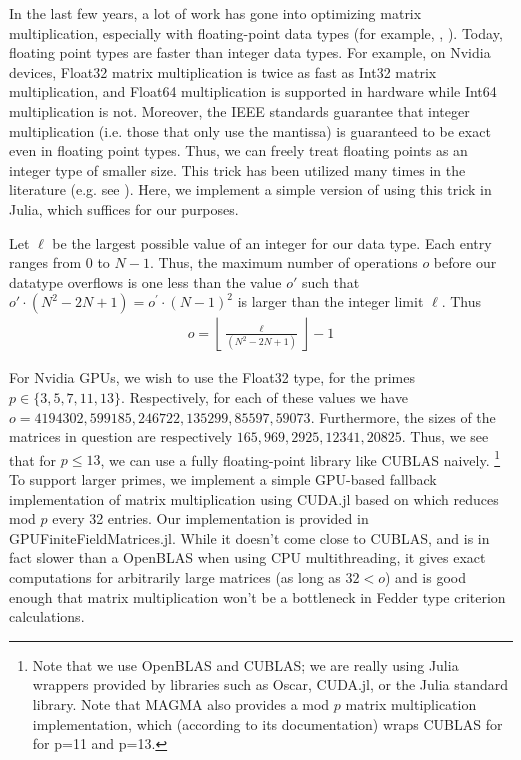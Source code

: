 In the last few years, a lot of work has gone into optimizing matrix multiplication,
especially with floating-point data types
(for example, \cite{nvidia-2024-cublas}, \cite{openblas-2024-openblas}). 
Today, floating point types are faster than
integer data types.
For example, on Nvidia devices, Float32 matrix multiplication
is twice as fast as Int32 matrix multiplication, and Float64
multiplication is supported in hardware while Int64 multiplication
is not.
Moreover, the IEEE standards guarantee that integer multiplication (i.e. those that only use the mantissa) 
is guaranteed to be exact even in floating point types. 
Thus, we can freely treat floating points as an integer type of smaller size.
This trick has been utilized many times in the literature (e.g. see \cite{bglm-2024-matmul-modp}).
Here, we implement a simple version of using this trick in Julia,
which suffices for our purposes.

Let \(\ell\) be the largest possible value of an integer for our data type.
Each entry ranges from \(0\) to \(N-1\).
Thus, the maximum number of operations $o$ before our datatype overflows is one less than the value $o'$ such that 
$o' \cdot (N^2 - 2N + 1) = o^{\prime} \cdot (N-1)^{2} $ is larger than the integer limit $\ell$. Thus
\begin{align*}
    o = \left\lfloor \frac{\ell}{(N^2 - 2N + 1)} \right\rfloor - 1
\end{align*}

For Nvidia GPUs, we wish to use the Float32 type, for the primes
\(p \in \{3,5,7,11,13\}\).
Respectively, for each of these values we have
\(o = 4194302, 599185, 246722, 135299, 85597, 59073\).
Furthermore, the sizes of the matrices in question are 
respectively
 \(165, 969, 2925, 12341, 20825\).
Thus, we see that for \(p \leq 13\), we can use a fully floating-point
library like CUBLAS naively.
\footnote{
    Note that we use OpenBLAS and CUBLAS; 
    we are really using Julia wrappers
    provided by libraries such as Oscar, 
    CUDA.jl, or the Julia standard library.
    Note that MAGMA also provides
    a mod $p$ matrix multiplication implementation,
    which (according to its documentation) wraps CUBLAS for 
    for p=11 and
    p=13. 
}
To support larger primes, we implement a 
simple GPU-based fallback implementation of matrix multiplication using CUDA.jl
based on \cite{mao-2024-matmul}
which reduces mod \(p\) every 32 entries.
Our implementation is provided in GPUFiniteFieldMatrices.jl.
While it doesn't come close to CUBLAS, and is in fact slower
than a OpenBLAS when using CPU multithreading, it gives exact
computations for arbitrarily large
matrices (as long as \(32 < o\))
and is good enough that
matrix multiplication won't be a bottleneck in 
Fedder type criterion calculations.


